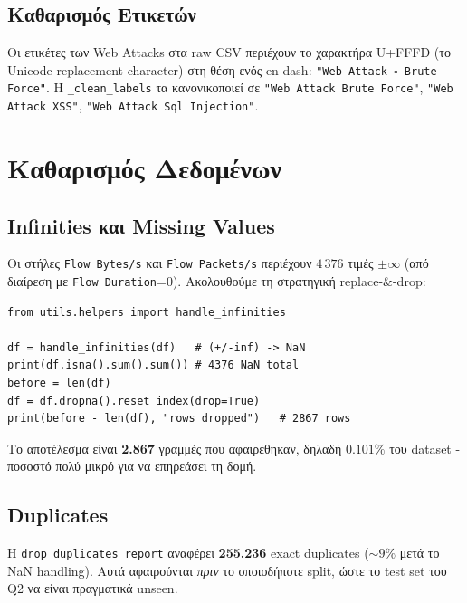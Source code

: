 \documentclass[12pt,a4paper,twoside]{book}
\begin{document}
\subsection{Καθαρισμός Ετικετών}

Οι ετικέτες των Web Attacks στα raw CSV περιέχουν το χαρακτήρα U+FFFD (το
Unicode replacement character) στη θέση ενός en-dash:
\texttt{"Web Attack \(\square\) Brute Force"}. Η \texttt{\_clean\_labels}
τα κανονικοποιεί σε \texttt{"Web Attack Brute Force"}, \texttt{"Web Attack XSS"},
\texttt{"Web Attack Sql Injection"}.

\section{Καθαρισμός Δεδομένων}

\subsection{Infinities και Missing Values}

Οι στήλες \texttt{Flow Bytes/s} και \texttt{Flow Packets/s} περιέχουν
\(4\,376\) τιμές \(\pm\infty\) (από διαίρεση με \texttt{Flow Duration}=0).
Ακολουθούμε τη στρατηγική replace-\&-drop:

\begin{tcolorbox}[myCustomStyle={Inf και NaN}]
\begin{lstlisting}[style=myPythonStyle]
from utils.helpers import handle_infinities

df = handle_infinities(df)   # (+/-inf) -> NaN
print(df.isna().sum().sum()) # 4376 NaN total
before = len(df)
df = df.dropna().reset_index(drop=True)
print(before - len(df), "rows dropped")   # 2867 rows
\end{lstlisting}
\end{tcolorbox}

Το αποτέλεσμα είναι \textbf{2.867} γραμμές που αφαιρέθηκαν, δηλαδή
\(0.101\%\) του dataset - ποσοστό πολύ μικρό για να επηρεάσει τη δομή.

\subsection{Duplicates}

Η \texttt{drop\_duplicates\_report} αναφέρει \textbf{255.236} exact
duplicates (\(\sim 9\%\) μετά το NaN handling). Αυτά αφαιρούνται \textit{πριν}
το οποιοδήποτε split, ώστε το test set του Q2 να είναι πραγματικά unseen.
\end{document}
